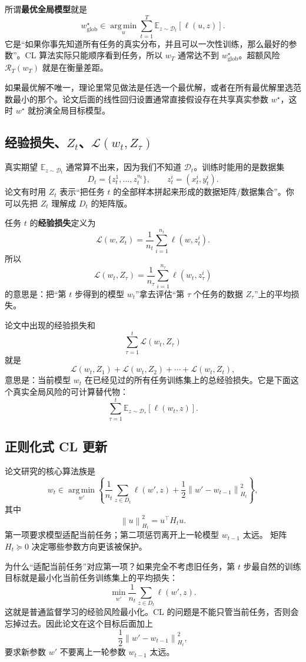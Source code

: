 \documentclass[UTF8,fontset=none,11pt]{ctexart}
\theoremstyle{cnstyle}
\newcommand{\E}{\mathbb{E}}
\newcommand{\argmin}{\operatorname*{arg\,min}}
\newcommand{\calR}{\mathcal{R}}
\newcommand{\calL}{\mathcal{L}}
\newcommand{\calD}{\mathcal{D}}
\newcommand{\norm}[1]{\left\lVert #1\right\rVert}
\begin{document}
所谓\textbf{最优全局模型}就是
\[
  w_{\mathrm{glob}}^\star
  \in
  \argmin_u
  \sum_{t=1}^T\E_{z\sim\calD_t}[\ell(u,z)] .
\]
它是“如果你事先知道所有任务的真实分布，并且可以一次性训练，那么最好的参数”。CL 算法实际只能顺序看到任务，所以 \(w_T\) 通常达不到 \(w_{\mathrm{glob}}^\star\)。超额风险 \(\calR_T(w_T)\) 就是在衡量差距。

如果最优解不唯一，理论里常见做法是任选一个最优解，或者在所有最优解里选范数最小的那个。论文后面的线性回归设置通常直接假设存在共享真实参数 \(w^\star\)，这时 \(w^\star\) 就扮演全局目标模型。

\subsection{经验损失、\(Z_t\)、\(\calL(w_t,Z_\tau)\)}

真实期望 \(\E_{z\sim\calD_t}\) 通常算不出来，因为我们不知道 \(\calD_t\)。训练时能用的是数据集
\[
  D_t=\{z_t^1,\dots,z_t^{n_t}\},
  \qquad
  z_t^i=(x_t^i,y_t^i).
\]
论文有时用 \(Z_t\) 表示“把任务 \(t\) 的全部样本拼起来形成的数据矩阵/数据集合”。你可以先把 \(Z_t\) 理解成 \(D_t\) 的矩阵版。

任务 \(t\) 的\textbf{经验损失}定义为
\[
  \calL(w,Z_t)
  =
  \frac1{n_t}\sum_{i=1}^{n_t}\ell(w,z_t^i).
\]
所以
\[
  \calL(w_t,Z_\tau)
  =
  \frac1{n_\tau}\sum_{i=1}^{n_\tau}\ell(w_t,z_\tau^i)
\]
的意思是：把“第 \(t\) 步得到的模型 \(w_t\)”拿去评估“第 \(\tau\) 个任务的数据 \(Z_\tau\)”上的平均损失。

论文中出现的经验损失和
\[
  \sum_{\tau=1}^t\calL(w_t,Z_\tau)
\]
就是
\[
  \calL(w_t,Z_1)+\calL(w_t,Z_2)+\cdots+\calL(w_t,Z_t),
\]
意思是：当前模型 \(w_t\) 在已经见过的所有任务训练集上的总经验损失。它是下面这个真实全局风险的可计算替代物：
\[
  \sum_{\tau=1}^t\E_{z\sim\calD_\tau}[\ell(w_t,z)].
\]

\subsection{正则化式 CL 更新}

论文研究的核心算法族是
\begin{equation}
  w_t\in\argmin_{w'}
  \left\{
  \frac{1}{n_t}\sum_{z\in D_t}\ell(w',z)
  +\frac12\norm{w'-w_{t-1}}_{H_t}^2
  \right\},
  \label{eq:regularized-cl}
\end{equation}
其中
\[
  \norm{u}_{H_t}^2=u^\top H_tu .
\]
第一项要求模型适配当前任务；第二项惩罚离开上一轮模型 \(w_{t-1}\) 太远。
矩阵 \(H_t\succeq 0\) 决定哪些参数方向更该被保护。

为什么“适配当前任务”对应第一项？如果完全不考虑旧任务，第 \(t\) 步最自然的训练目标就是最小化当前任务训练集上的平均损失：
\[
  \min_{w'}\frac1{n_t}\sum_{z\in D_t}\ell(w',z).
\]
这就是普通监督学习的经验风险最小化。CL 的问题是不能只管当前任务，否则会忘掉过去。因此论文在这个目标后面加上
\[
  \frac12\norm{w'-w_{t-1}}_{H_t}^2,
\]
要求新参数 \(w'\) 不要离上一轮参数 \(w_{t-1}\) 太远。
\end{document}
